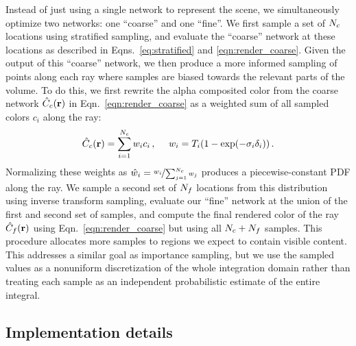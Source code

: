 \documentclass[runningheads]{llncs}
\begin{document}
Instead of just using a single network to represent the scene, we simultaneously optimize two networks: one ``coarse'' and one ``fine''.
We first sample a set of $N_c$ locations using stratified sampling, and evaluate the ``coarse'' network at these locations as described in Eqns.~\ref{eq:stratified} and \ref{eqn:render_coarse}. Given the output of this ``coarse'' network, we then produce a more informed sampling of points along each ray where samples are biased towards the relevant parts of the volume. To do this, we first rewrite the alpha composited color from the coarse network $\hat{C}_c(\mathbf{r})$ in Eqn.~\ref{eqn:render_coarse} as a weighted sum of all sampled colors $c_i$ along the ray:
\begin{equation}
  \Ccoarse=\sum_{i=1}^{\numsamplescoarse}\pweight_i c_i\,, \quad\,\,
  \pweight_i = T_i(1-\expo{-\absrp_i \deltatime_i})\,.
  \label{eqn:weights}
\end{equation}
Normalizing these weights as $\hat{w}_i = \nicefrac{w_i}{\sum_{j=1}^{N_c} w_j}$ produces a piecewise-constant PDF along the ray.
We sample a second set of $N_f$ locations from this distribution using inverse transform sampling, evaluate our ``fine'' network at the union of the first and second set of samples, and compute the final rendered color of the ray $\hat{C}_f(\mathbf{r})$ using Eqn.~\ref{eqn:render_coarse} but using all $N_c+N_f$ samples. This procedure allocates more samples to regions we expect to contain visible content. This addresses a similar goal as importance sampling, but we use the sampled values as a nonuniform discretization of the whole integration domain rather than treating each sample as an independent probabilistic estimate of the entire integral.

\subsection{Implementation details}
\end{document}
